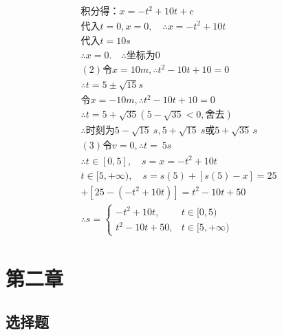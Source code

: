 \documentclass[b5paper,opensource]{./template/qyxf-book}
\begin{document}
\begin{gather*}
\text{积分得：}x=-t^2+10t+c\\
\text{代入}t=0,x=0,\quad \therefore x=-t^2+10t\\
\text{代入}t=10s\\
\therefore x=0.\quad
\therefore\text{坐标为}0\\
(2)\text{令}x=10m,\therefore t^2-10t+10=0\\
\therefore t=5\pm\sqrt{15}s\\
\text{令}x=-10m,\therefore t^2-10t+10=0\\
\therefore t=5+\sqrt{35}(5-\sqrt{35}<0,\text{舍去})\\
\therefore\text{时刻为}5-\sqrt{15}\ s,5+\sqrt{15}\ s\text{或}5+\sqrt{35}\,s\\
(3)\text{令}v=0,\therefore t=\ 5s\\
\therefore t\in[0,5],\quad s=x=-t^2+10t\\
t\in[5,+\infty),\quad s=s(5)+[s(5)-x]=25\\+[25-(-t^2+10t)]
=t^2-10t+50\\
\therefore s=
\begin{cases}
-t^2+10t,&t\in[0,5)\\
t^2-10t+50,&t\in[5,+\infty)
\end{cases}
\end{gather*}

\chapter{第二章}
\section{选择题}
\end{document}
